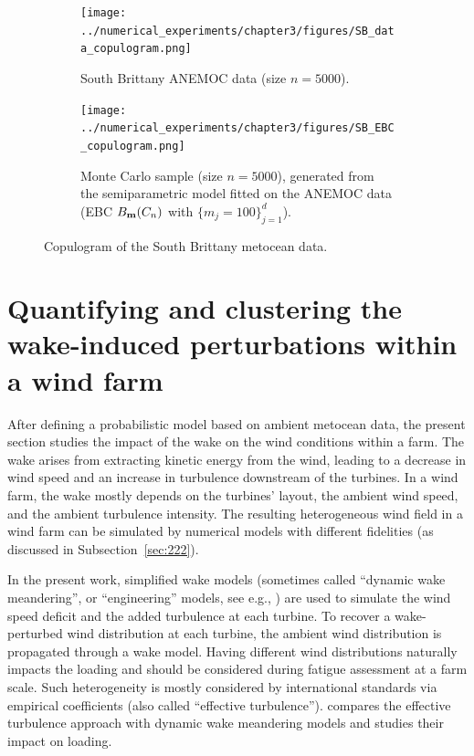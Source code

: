 \begin{landscape}
    \begin{figure}
        \begin{subfigure}[b]{0.49\linewidth}
            \centering
            \texttt{[image: ../numerical\_experiments/chapter3/figures/SB\_data\_copulogram.png]}
            \vspace*{2pt}
            \caption{South Brittany ANEMOC data (size $n=5000$).}
        \end{subfigure}
        \begin{subfigure}[b]{0.49\linewidth}
            \centering
            \texttt{[image: ../numerical\_experiments/chapter3/figures/SB\_EBC\_copulogram.png]}
            \caption{Monte Carlo sample (size $n=5000$), generated from the semiparametric model fitted on the ANEMOC data (EBC $B_{{\bf m}}(C_n)$ with $ \{m_j=100\}_{j=1}^d$).}
        \end{subfigure}
        \vspace*{5pt} 
        \caption{Copulogram of the South Brittany metocean data.}
        \label{fig:sb_copulograms}
    \end{figure}
\end{landscape}






\section{Quantifying and clustering the wake-induced perturbations within a wind farm}\label{sec:wake_clust}
After defining a probabilistic model based on ambient metocean data, the present section studies the impact of the wake on the wind conditions within a farm. 
The wake arises from extracting kinetic energy from the wind, leading to a decrease in wind speed and an increase in turbulence downstream of the turbines. 
In a wind farm, the wake mostly depends on the turbines' layout, the ambient wind speed, and the ambient turbulence intensity. 
The resulting heterogeneous wind field in a wind farm can be simulated by numerical models with different fidelities (as discussed in Subsection~\ref{sec:222}). 

In the present work, simplified wake models (sometimes called ``dynamic wake meandering'', or ``engineering'' models, see e.g., \citealp{doubrawa_2020_benchmark}) are used to simulate the wind speed deficit and the added turbulence at each turbine. 
To recover a wake-perturbed wind distribution at each turbine, the ambient wind distribution is propagated through a wake model. 
Having different wind distributions naturally impacts the loading and should be considered during fatigue assessment at a farm scale. 
Such heterogeneity is mostly considered by international standards via empirical coefficients (also called ``effective turbulence''). 
\citet{doubrawa_2023} compares the effective turbulence approach with dynamic wake meandering models and studies their impact on loading. 

